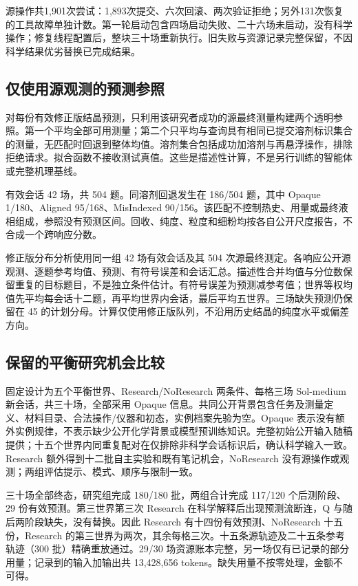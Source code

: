 \documentclass[10pt,a4paper]{article}
\begin{document}
源操作共1,901次尝试：1,893次提交、六次回滚、两次验证拒绝；另外131次恢复的工具故障单独计数。第一轮启动包含四场启动失败、二十六场未启动，没有科学操作；修复线程配置后，整块三十场重新执行。旧失败与资源记录完整保留，不因科学结果优劣替换已完成结果。

\subsection{仅使用源观测的预测参照}\label{ux4ec5ux4f7fux7528ux6e90ux89c2ux6d4bux7684ux9884ux6d4bux53c2ux7167}

对每份有效修正版结晶预测，只利用该研究者成功的源最终测量构建两个透明参照。第一个平均全部可用测量；第二个只平均与查询具有相同已提交溶剂标识集合的测量，无匹配时回退到整体均值。溶剂集合包括成功加溶剂与再悬浮操作，排除拒绝请求。拟合函数不接收测试真值。这些是描述性计算，不是另行训练的智能体或完整机理基线。

有效会话 42 场，共 504 题。同溶剂回退发生在 186/504 题，其中 Opaque 1/180、Aligned 95/168、MisIndexed 90/156。该匹配不控制热史、用量或最终液相组成，参照没有预测区间。回收、纯度、粒度和细粉均按各自公开尺度报告，不合成一个跨响应分数。

修正版分布分析使用同一组 42 场有效会话及其 504 次源最终测定。各响应公开源观测、逐题参考均值、预测、有符号误差和会话汇总。描述性合并均值与分位数保留重复的目标题目，不是独立条件估计。有符号误差为预测减参考值；世界等权均值先平均每会话十二题，再平均世界内会话，最后平均五世界。三场缺失预测仍保留在 45 的计划分母。计算仅使用修正版队列，不沿用历史结晶的纯度水平或偏差方向。

\subsection{保留的平衡研究机会比较}\label{ux4fddux7559ux7684ux5e73ux8861ux7814ux7a76ux673aux4f1aux6bd4ux8f83}

固定设计为五个平衡世界、Research/NoResearch 两条件、每格三场 Sol-medium 新会话，共三十场，全部采用 Opaque 信息。共同公开背景包含任务及测量定义、材料目录、合法操作/仪器和初态，实例档案先验为空。Opaque 表示没有额外实例规律，不表示缺少公开化学背景或模型预训练知识。完整初始公开输入随稿提供；十五个世界内同重复配对在仅排除非科学会话标识后，确认科学输入一致。Research 额外得到十二批自主实验和既有笔记机会，NoResearch 没有源操作或观测；两组评估提示、模式、顺序与限制一致。

三十场全部终态，研究组完成 180/180 批，两组合计完成 117/120 个后测阶段、29 份有效预测。第三世界第三次 Research 在科学解释后出现预测流断连，Q 与随后两阶段缺失，没有替换。因此 Research 有十四份有效预测、NoResearch 十五份，Research 的第三世界为两次，其余每格三次。十五条源轨迹及二十五条参考轨迹（300 批）精确重放通过。29/30 场资源账本完整，另一场仅有已记录的部分用量；记录到的输入加输出共 13,428,656 tokens。缺失用量不按零处理，金额不可得。
\end{document}
